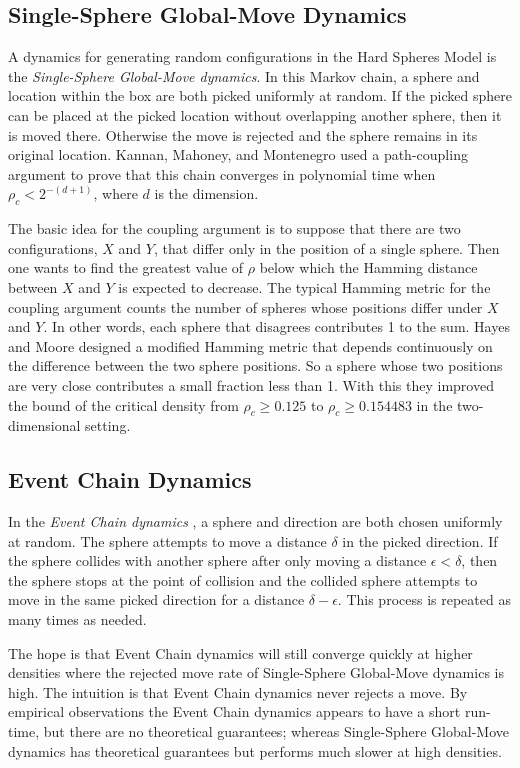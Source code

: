 \documentclass[a4paper,11pt]{article}
\begin{document}
\subsection*{Single-Sphere Global-Move Dynamics}

A dynamics for generating random configurations in the Hard Spheres Model is the \textit{Single-Sphere Global-Move dynamics}.  In this Markov chain, a sphere and location within the box are both picked uniformly at random.  If the picked sphere can be placed at the picked location without overlapping another sphere, then it is moved there.  Otherwise the move is rejected and the sphere remains in its original location.  Kannan, Mahoney, and Montenegro \cite{Kannan} used a path-coupling argument to prove that this chain converges in polynomial time when $\rho_c < 2^{-(d + 1)}$, where $d$ is the dimension.

The basic idea for the coupling argument is to suppose that there are two configurations, $X$ and $Y$, that differ only in the position of a single sphere.  Then one wants to find the greatest value of $\rho$ below which the Hamming distance between $X$ and $Y$ is expected to decrease.  The typical Hamming metric for the coupling argument counts the number of spheres whose positions differ under $X$ and $Y$.  In other words, each sphere that disagrees contributes 1 to the sum. Hayes and Moore \cite{Hayes} designed a modified Hamming metric that depends continuously on the difference between the two sphere positions.  So a sphere whose two positions are very close contributes a small fraction less than 1.  With this they improved the bound of the critical density from $\rho_c \ge 0.125$ to $\rho_c \ge 0.154483$ in the two-dimensional setting.

\subsection*{Event Chain Dynamics}

In the \textit{Event Chain dynamics} \cite{Bernard}, a sphere and direction are both chosen uniformly at random.  The sphere attempts to move a distance $\delta$ in the picked direction.  If the sphere collides with another sphere after only moving a distance $\epsilon < \delta$, then the sphere stops at the point of collision and the collided sphere attempts to move in the same picked direction for a distance $\delta - \epsilon$.  This process is repeated as many times as needed.

The hope is that Event Chain dynamics will still converge quickly at higher densities where the rejected move rate of Single-Sphere Global-Move dynamics is high.  The intuition is that Event Chain dynamics never rejects a move.  By empirical observations the Event Chain dynamics appears to have a short run-time, but there are no theoretical guarantees; whereas Single-Sphere Global-Move dynamics has theoretical guarantees but performs much slower at high densities.
\end{document}
